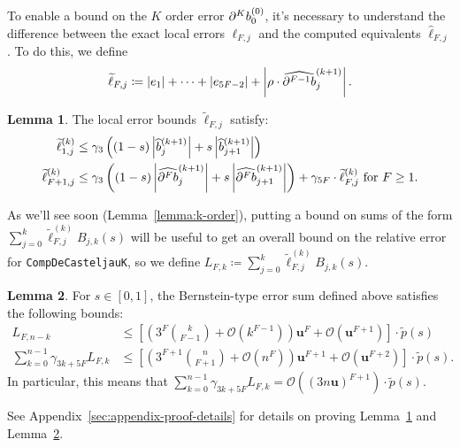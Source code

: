 \documentclass[3p, authoryear, square]{elsarticle}
\theoremstyle{definition}
\newtheorem{lemma}{Lemma}[section]
\newcommand{\bigO}[1]{\mathcal{O}\left(#1\right)}
\newcommand{\mach}{\mathbf{u}}
\newcommand{\db}[1]{
  \ifthenelse{\equal{#1}{1}}
             {\partial b}
             {\partial^{#1} b}
}
\newcommand{\cdb}[1]{
  \ifthenelse{\equal{#1}{1}}
             {\widehat{\partial b}}
             {\widehat{\partial^{#1} b}}
}
\begin{document}
To enable a bound on the \(K\) order error \(\db{K}^{(0)}_0\), it's necessary
to understand the difference between the exact local errors \(\ell_{F, j}\)
and the computed equivalents \(\widehat{\ell}_{F, j}\). To do this, we define
\begin{equation}
\widetilde{\ell}_{F, j} \coloneqq \left|e_1\right| +
\cdots + \left|e_{5F - 2}\right| + \left|\rho \cdot
\cdb{F - 1}_j^{(k + 1)}\right|.
\end{equation}

\begin{lemma}\label{lemma:ell-tilde}
The local error bounds \(\widetilde{\ell}_{F, j}\) satisfy:
\begin{align}
\widetilde{\ell}_{1, j}^{(k)} &\leq
  \gamma_3 \left(
  (1 - s) \left|\widehat{b}_j^{(k + 1)}\right| +
  s \left|\widehat{b}_{j + 1}^{(k + 1)}\right|\right)
  \label{ell-tilde-1} \\
\widetilde{\ell}_{F + 1, j}^{(k)} &\leq
  \gamma_3 \left(
  (1 - s) \left|\cdb{F}_j^{(k + 1)}\right| +
  s \left|\cdb{F}_{j + 1}^{(k + 1)}\right|\right) +
  \gamma_{5F} \cdot \widetilde{\ell}_{F, j}^{(k)}
  \text{ for } F \geq 1.
\end{align}
\end{lemma}

As we'll see soon (Lemma~\ref{lemma:k-order}), putting a bound on
sums of the form \(\sum_{j = 0}^k \widetilde{\ell}_{F, j}^{(k)} B_{j, k}(s)\) will
be useful to get an overall bound on the relative error for
\texttt{CompDeCasteljauK}, so we define
\(L_{F, k} \coloneqq \sum_{j = 0}^k \widetilde{\ell}_{F, j}^{(k)} B_{j, k}(s)\).

\begin{lemma}\label{lemma:L-and-D-bounds}
For \(s \in \left[0, 1\right]\), the Bernstein-type error sum defined above
satisfies the following bounds:
\begin{align}
L_{F, n - k} &\leq \left[\left(3^F \binom{k}{F - 1} + \bigO{k^{F - 1}}\right)
  \mach^F + \bigO{\mach^{F + 1}}\right] \cdot \widetilde{p}(s) \\
\sum_{k = 0}^{n - 1} \gamma_{3k + 5F} L_{F, k} &\leq
  \left[\left(3^{F + 1} \binom{n}{F + 1} + \bigO{n^F}\right)
  \mach^{F + 1} + \bigO{\mach^{F + 2}}\right] \cdot \widetilde{p}(s).
  \label{L-sum-bound}
\end{align}
In particular, this means that
\(\sum_{k = 0}^{n - 1} \gamma_{3k + 5F} L_{F, k} =
\bigO{(3 n \mach)^{F + 1}} \cdot \widetilde{p}(s)\).
\end{lemma}

See Appendix~\ref{sec:appendix-proof-details} for details on
proving Lemma~\ref{lemma:ell-tilde} and Lemma~\ref{lemma:L-and-D-bounds}.
\end{document}
